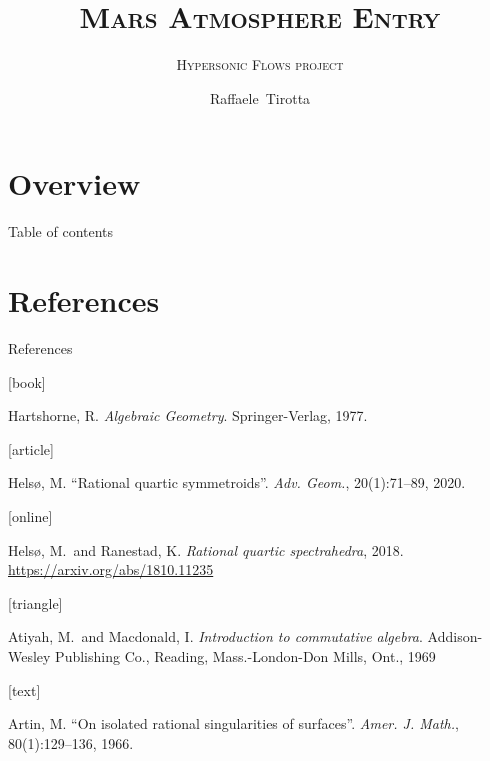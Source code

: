 \documentclass[UKenglish]{beamer}
\author{Raffaele~Tirotta}
\title{\textsc{Mars Atmosphere Entry}}
\subtitle{\textsc{Hypersonic Flows project}}
\begin{document}
    \section{Overview}
    \begin{frame}{Table of contents}
        \tableofcontents[currentsection]
    \end{frame}

    
    

    \section{References}

    \begin{frame}[allowframebreaks]{References}
        \begin{thebibliography}{}

            [book]

            Hartshorne, R.
            \newblock \emph{Algebraic Geometry}.
            \newblock Springer-Verlag, 1977.

            [article]

            Helsø, M.
            \newblock \enquote{Rational quartic symmetroids}.
            \newblock \emph{Adv. Geom.}, 20(1):71--89, 2020.

            [online]

            Helsø, M.\ and Ranestad, K.
            \newblock \emph{Rational quartic spectrahedra}, 2018.
            \newblock \url{https://arxiv.org/abs/1810.11235}

            [triangle]

            Atiyah, M.\ and Macdonald, I.
            \newblock \emph{Introduction to commutative algebra}.
            \newblock Addison-Wesley Publishing Co., Reading, Mass.-London-Don
            Mills, Ont., 1969

            [text]

            Artin, M.
            \newblock \enquote{On isolated rational singularities of surfaces}.
            \newblock \emph{Amer. J. Math.}, 80(1):129--136, 1966.

        \end{thebibliography}
    \end{frame}
\end{document}
